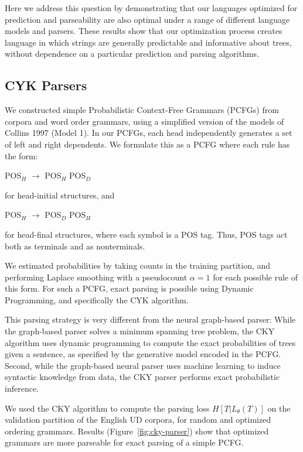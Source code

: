 \documentclass[12pt]{article}
\begin{document}
Here we address this question by demonstrating that our languages optimized for prediction and parseability are also optimal under a range of different language models and parsers. These results show that our optimization process creates language in which strings are generally predictable and informative about trees, without dependence on a particular prediction and parsing algorithms.

\subsection{CYK Parsers}


We constructed simple Probabilistic Context-Free Grammars (PCFGs) from corpora and word order grammars, using a simplified version of the models of Collins 1997 (Model 1).
In our PCFGs, each head independently generates a set of left and right dependents.
We formulate this as a PCFG where each rule has the form:
\begin{center}
	POS$_H$ $\rightarrow$ POS$_H$ POS$_D$
\end{center}
for head-initial structures, and
\begin{center}
	POS$_H$ $\rightarrow$ POS$_D$ POS$_H$
\end{center}
for head-final structures, where each symbol is a POS tag.
Thus, POS tags act both as terminals and as nonterminals.

We estimated probabilities by taking counts in the training partition, and performing Laplace smoothing with a pseudocount $\alpha=1$ for each possible rule of this form.
For such a PCFG, exact parsing is possible using Dynamic Programming, and specifically the CYK algorithm.

This parsing strategy is very different from the neural graph-based parser:
While the graph-based parser solves a minimum spanning tree problem, the CKY algorithm uses dynamic programming to compute the exact probabilities of trees given a sentence, as specified by the generative model encoded in the PCFG.
Second, while the graph-based neural parser uses machine learning to induce syntactic knowledge from data, the CKY parser performs exact probabilistic inference.

We used the CKY algorithm to compute the parsing loss $H[T|L_\theta(T)]$ on the validation partition of the English UD corpora, for random and optimized ordering grammars.
Results (Figure~\ref{fig:cky-parser}) show that optimized grammars are more parseable for exact parsing of a simple PCFG.
\end{document}
